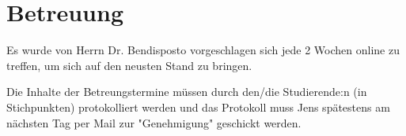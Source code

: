 \chapter{Betreuung}
Es wurde von Herrn Dr. Bendisposto vorgeschlagen sich jede 2 Wochen online zu treffen, um sich auf den neusten Stand zu bringen.


Die Inhalte der Betreungstermine müssen durch den/die Studierende:n (in Stichpunkten) protokolliert werden und das Protokoll muss Jens spätestens am nächsten Tag per Mail zur "Genehmigung" geschickt werden. 